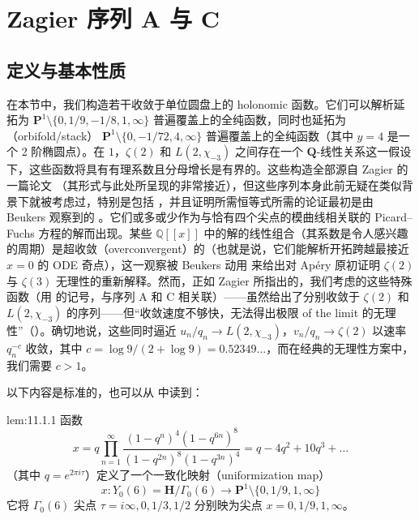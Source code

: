 \section{Zagier 序列 A 与 C}\label{sec:11}

\subsection{定义与基本性质}\label{sec:11.1}

在本节中，我们构造若干收敛于单位圆盘上的 holonomic 函数。它们可以解析延拓为 $\mathbf{P}^1 \setminus \{0, 1/9, -1/8, 1, \infty\}$ 普遍覆盖上的全纯函数，同时也延拓为（orbifold/stack） $\mathbf{P}^1 \setminus \{0, -1/72, 4, \infty\}$ 普遍覆盖上的全纯函数（其中 $y = 4$ 是一个 2 阶椭圆点）。在 $1$，$\zeta(2)$ 和 $L(2,\chi_{-3})$ 之间存在一个 $\mathbf{Q}$-线性关系这一假设下，这些函数将具有有理系数且分母增长是有界的。这些构造全部源自 Zagier 的一篇论文 \cite{Zag09}（其形式与此处所呈现的非常接近），但这些序列本身此前无疑在类似背景下就被考虑过，特别是包括 \cite{SB85}，并且证明所需恒等式所需的论证最初是由 Beukers 观察到的 \cite{Beu87}。它们或多或少作为与恰有四个尖点的模曲线相关联的 Picard--Fuchs 方程的解而出现。某些 $\mathbb{Q}[\![x]\!]$ 中的解的线性组合（其系数是令人感兴趣的周期）是超收敛（overconvergent）的（也就是说，它们能解析开拓跨越最接近 $x=0$ 的 ODE 奇点），这一观察被 Beukers 动用 \cite{Beu87} 来给出对 Ap{\'e}ry 原初证明 $\zeta(2)$ 与 $\zeta(3)$ 无理性的重新解释。然而，正如 Zagier 所指出的，我们考虑的这些特殊函数（用 \cite{Zag09} 的记号，与序列 A 和 C 相关联）——虽然给出了分别收敛于 $\zeta(2)$ 和 $L(2,\chi_{-3})$ 的序列——但“收敛速度不够快，无法得出极限 of the limit 的无理性”（\cite[第 360 页]{Zag09}）。确切地说，这些同时逼近 $u_n/q_n \to L(2,\chi_{-3})$，$v_n/q_n \to \zeta(2)$ 以速率 $q_n^{-c}$ 收敛，其中 $c = \log 9/(2 + \log 9) = 0.52349\dots$，而在经典的无理性方案中，我们需要 $c > 1$。

以下内容是标准的，也可以从 \cite[第 357 页, 表 3]{Zag09} 中读到：

\begin{mylemma}{}{lem:11.1.1}
函数
\begin{equation}\label{eq:11.1.2}
x = q \prod_{n=1}^{\infty} \frac{(1-q^n)^4 (1-q^{6n})^8}{(1-q^{2n})^8 (1-q^{3n})^4} = q - 4q^2 + 10q^3 + \dots
\end{equation}
（其中 $q = e^{2\pi i \tau}$）定义了一个一致化映射（uniformization map）
\[ x: Y_0(6) = \mathbf{H}/\Gamma_0(6) \to \mathbf{P}^1 \setminus \{0, 1/9, 1, \infty\} \]
它将 $\Gamma_0(6)$ 尖点 $\tau = i\infty, 0, 1/3, 1/2$ 分别映为尖点 $x = 0, 1/9, 1, \infty$。
\end{mylemma}

